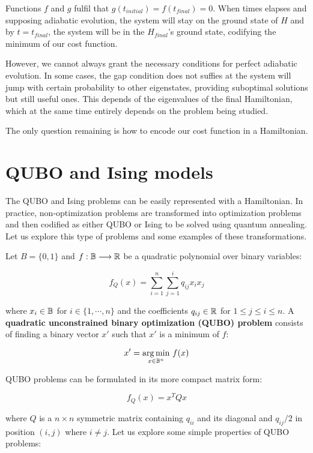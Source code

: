 Functions $f$ and $g$ fulfil that $g(t_{initial}) = f(t_{final}) = 0$. When times elapses and supposing adiabatic evolution, the system will stay on the ground state of $H$ and by $t = t_{final}$, the system will be in the $H_{final}$'s ground state, codifying the minimum of our cost function.

However, we cannot always grant the necessary conditions for perfect adiabatic evolution. In some cases, the gap condition does not suffies at the system will jump with certain probability to other eigenstates, providing suboptimal solutions but still useful ones. This depends of the eigenvalues of the final Hamiltonian, which at the same time entirely depends on the problem being studied.

The only question remaining is how to encode our cost function in a Hamiltonian.


\section{QUBO and Ising models}


The QUBO and Ising problems can be easily represented with a Hamiltonian. In practice, non-optimization problems are transformed into optimization problems and then codified as either QUBO or Ising to be solved using quantum annealing. Let us explore this type of problems and some examples of these transformations.

Let $B = \{0,1\}$ and $f: \mathbb{B} \longrightarrow \mathbb{R} $ be a quadratic polynomial over binary variables:

$$ f_Q(x) = \sum_{i=1}^n \sum_{j=1}^i q_{ij} x_i x_j $$

where $x_i \in \mathbb{B}$ for $i \in \{1, \cdots, n\}$ and the coefficients $q_{ij} \in \mathbb{R}$ for $1 \leq j \leq i \leq n$. A \textbf{quadratic unconstrained binary optimization (QUBO) problem} consists of finding a binary vector $x'$ such that $x'$ is a minimum of $f$:

$$ x' = \underset {x \in \mathbb{B}^n }{\arg \min} ~ f(x) $$

QUBO problems can be formulated in its more compact matrix form:

$$ f_Q(x) = x^T Q x $$

where $Q$ is a $n \times n$ symmetric matrix containing $q_{ii}$ and its diagonal and $q_{ij} / 2$ in position $(i,j)$ where $i \neq j$. Let us explore some simple properties of QUBO problems:

